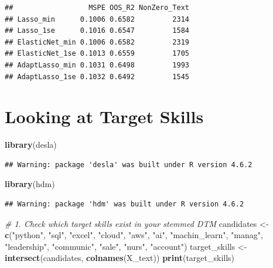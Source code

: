 \documentclass[
]{article}
\newenvironment{Shaded}{\begin{snugshade}}{\end{snugshade}}
\newcommand{\CommentTok}[1]{\textcolor[rgb]{0.56,0.35,0.01}{\textit{#1}}}
\newcommand{\FunctionTok}[1]{\textcolor[rgb]{0.13,0.29,0.53}{\textbf{#1}}}
\newcommand{\NormalTok}[1]{#1}
\newcommand{\OtherTok}[1]{\textcolor[rgb]{0.56,0.35,0.01}{#1}}
\newcommand{\StringTok}[1]{\textcolor[rgb]{0.31,0.60,0.02}{#1}}
\begin{document}
\begin{verbatim}
##                  MSPE OOS_R2 NonZero_Text
## Lasso_min      0.1006 0.6582         2314
## Lasso_1se      0.1016 0.6547         1584
## ElasticNet_min 0.1006 0.6582         2319
## ElasticNet_1se 0.1013 0.6559         1705
## AdaptLasso_min 0.1031 0.6498         1993
## AdaptLasso_1se 0.1032 0.6492         1545
\end{verbatim}

\section{Looking at Target Skills}\label{looking-at-target-skills}

\begin{Shaded}
\begin{Highlighting}[]
\FunctionTok{library}\NormalTok{(desla)}
\end{Highlighting}
\end{Shaded}

\begin{verbatim}
## Warning: package 'desla' was built under R version 4.6.2
\end{verbatim}

\begin{Shaded}
\begin{Highlighting}[]
\FunctionTok{library}\NormalTok{(hdm)}
\end{Highlighting}
\end{Shaded}

\begin{verbatim}
## Warning: package 'hdm' was built under R version 4.6.2
\end{verbatim}

\begin{Shaded}
\begin{Highlighting}[]
\CommentTok{\# 1. Check which target skills exist in your stemmed DTM}
\NormalTok{candidates }\OtherTok{\textless{}{-}} \FunctionTok{c}\NormalTok{(}\StringTok{"python"}\NormalTok{, }\StringTok{"sql"}\NormalTok{, }\StringTok{"excel"}\NormalTok{, }\StringTok{"cloud"}\NormalTok{, }\StringTok{"aws"}\NormalTok{, }\StringTok{"ai"}\NormalTok{, }\StringTok{"machin\_learn"}\NormalTok{,}
                \StringTok{"manag"}\NormalTok{, }\StringTok{"leadership"}\NormalTok{, }\StringTok{"communic"}\NormalTok{, }\StringTok{"sale"}\NormalTok{, }\StringTok{"nurs"}\NormalTok{, }\StringTok{"account"}\NormalTok{)}
\NormalTok{target\_skills }\OtherTok{\textless{}{-}} \FunctionTok{intersect}\NormalTok{(candidates, }\FunctionTok{colnames}\NormalTok{(X\_text))}
\FunctionTok{print}\NormalTok{(target\_skills)}
\end{Highlighting}
\end{Shaded}
\end{document}
